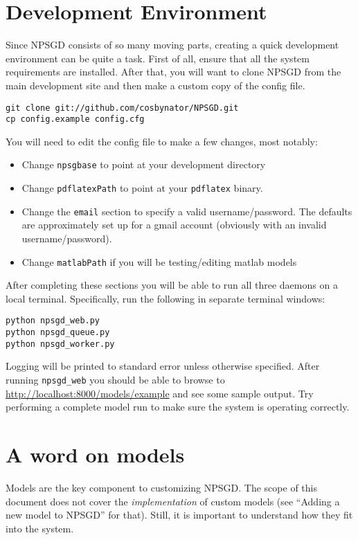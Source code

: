 \documentclass{article}
\begin{document}
\section{Development Environment}
Since NPSGD consists of so many moving parts, creating a quick development
environment can be quite a task. First of all, ensure that all the system
requirements are installed. After that, you will want to clone NPSGD from the
main development site and then make a custom copy of the config file.
\begin{verbatim}
git clone git://github.com/cosbynator/NPSGD.git
cp config.example config.cfg
\end{verbatim}

You will need to edit the config file to make a few changes, most notably:
\begin{itemize}
    \item Change \texttt{npsgbase} to point at your development directory
    \item Change \texttt{pdflatexPath} to point at your \texttt{pdflatex}
    binary.
    \item Change the \texttt{email} section to specify a valid
    username/password. The defaults are approximately set up for a gmail
    account (obviously with an invalid username/password).
    \item Change \texttt{matlabPath} if you will be testing/editing matlab
    models
\end{itemize}

After completing these sections you will be able to run all three daemons on a
local terminal. Specifically, run the following in separate terminal windows:
\begin{verbatim}
python npsgd_web.py
python npsgd_queue.py
python npsgd_worker.py
\end{verbatim}
Logging will be printed to standard error unless otherwise specified. After
running \texttt{npsgd\_web} you should be able to browse to
\url{http://localhost:8000/models/example} and see some sample output. Try
performing a complete model run to make sure the system is operating correctly.

\section{A word on models}
Models are the key component to customizing NPSGD. The scope of this document
does not cover the \textit{implementation} of custom models (see ``Adding a new
model to NPSGD'' for that). Still, it is important to understand how they fit
into the system.
\end{document}
